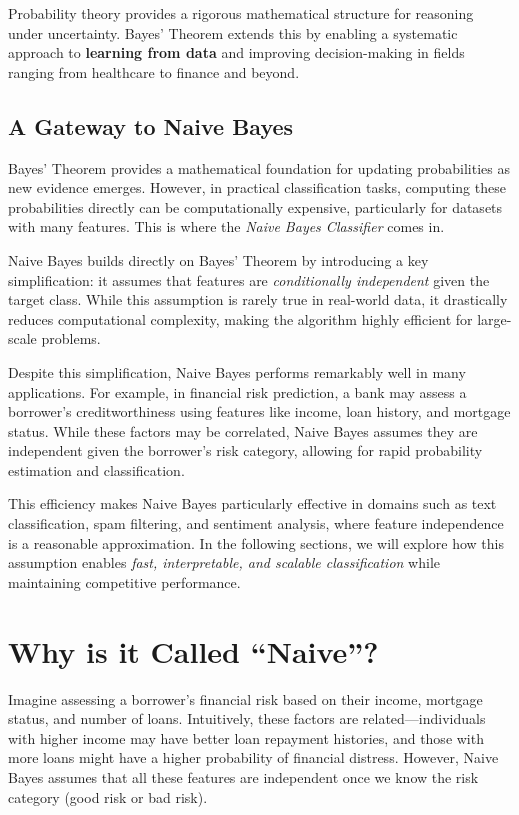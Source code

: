 \documentclass[
  11pt,
]{book}
\theoremstyle{definition}
\theoremstyle{definition}
\theoremstyle{definition}
\theoremstyle{definition}
\theoremstyle{remark}
\begin{document}
Probability theory provides a rigorous mathematical structure for reasoning under uncertainty. Bayes' Theorem extends this by enabling a systematic approach to \textbf{learning from data} and improving decision-making in fields ranging from healthcare to finance and beyond.

\subsection*{A Gateway to Naive Bayes}\label{a-gateway-to-naive-bayes}


Bayes' Theorem provides a mathematical foundation for updating probabilities as new evidence emerges. However, in practical classification tasks, computing these probabilities directly can be computationally expensive, particularly for datasets with many features. This is where the \emph{Naive Bayes Classifier} comes in.

Naive Bayes builds directly on Bayes' Theorem by introducing a key simplification: it assumes that features are \emph{conditionally independent} given the target class. While this assumption is rarely true in real-world data, it drastically reduces computational complexity, making the algorithm highly efficient for large-scale problems.

Despite this simplification, Naive Bayes performs remarkably well in many applications. For example, in financial risk prediction, a bank may assess a borrower's creditworthiness using features like income, loan history, and mortgage status. While these factors may be correlated, Naive Bayes assumes they are independent given the borrower's risk category, allowing for rapid probability estimation and classification.

This efficiency makes Naive Bayes particularly effective in domains such as text classification, spam filtering, and sentiment analysis, where feature independence is a reasonable approximation. In the following sections, we will explore how this assumption enables \emph{fast, interpretable, and scalable classification} while maintaining competitive performance.

\section{Why is it Called ``Naive''?}\label{why-is-it-called-naive}

Imagine assessing a borrower's financial risk based on their income, mortgage status, and number of loans. Intuitively, these factors are related---individuals with higher income may have better loan repayment histories, and those with more loans might have a higher probability of financial distress. However, Naive Bayes assumes that all these features are independent once we know the risk category (good risk or bad risk).
\end{document}
